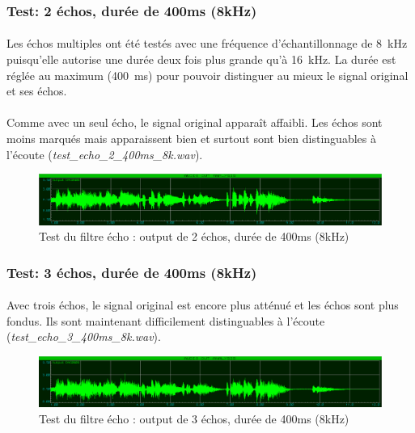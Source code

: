 \documentclass{article}
\begin{document}
    \subsubsection{Test: 2 échos, durée de 400ms (8kHz)}
    \paragraph{}
    Les échos multiples ont été testés avec une fréquence d'échantillonnage de \SI{8}{\kilo\hertz} puisqu'elle autorise une durée deux fois plus grande qu'à \SI{16}{\kilo\hertz}. La durée est réglée au maximum (\SI{400}{\milli\second}) pour pouvoir distinguer au mieux le signal original et ses échos.

    \paragraph{}
    Comme avec un seul écho, le signal original apparaît affaibli. Les échos sont moins marqués mais apparaissent bien et surtout sont bien distinguables à l'écoute (\emph{test\_echo\_2\_400ms\_8k.wav}).
    \begin{figure}[H]
        \centering
        \includegraphics[width=\textwidth]{./images/out_echo_2_400ms_8k.png}
        \caption{Test du filtre écho : output de 2 échos, durée de 400ms (8kHz)}
    \end{figure}

    \subsubsection{Test: 3 échos, durée de 400ms (8kHz)}
    \paragraph{}
    Avec trois échos, le signal original est encore plus atténué et les échos sont plus fondus. Ils sont maintenant difficilement distinguables à l'écoute (\emph{test\_echo\_3\_400ms\_8k.wav}).

    \begin{figure}[H]
        \centering
        \includegraphics[width=\textwidth]{./images/out_echo_3_400ms_8k.png}
        \caption{Test du filtre écho : output de 3 échos, durée de 400ms (8kHz)}
    \end{figure}
\end{document}
